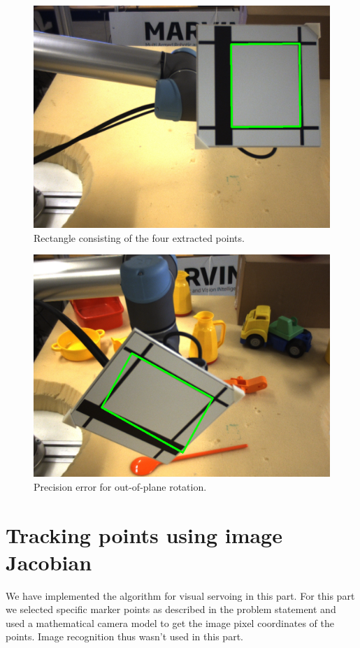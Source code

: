 \documentclass[]{scrartcl}
\begin{document}
\begin{figure}
	\centering
	\includegraphics[width=0.7\linewidth]{fig/src1-1.png}
	\caption{Rectangle consisting of the four extracted points.}
	\label{fig:src2}
\end{figure}

\begin{figure}
	\centering
	\includegraphics[width=0.7\linewidth]{fig/src1-63.png}
	\caption{Precision error for out-of-plane rotation.}
	\label{fig:err2}
\end{figure}

\clearpage
\section{Tracking points using image Jacobian}
We have implemented the algorithm for visual servoing in this part. For this part we selected specific marker points as described in the problem statement and used a mathematical camera model to get the image pixel coordinates of the points. Image recognition thus wasn't used in this part.
\end{document}
